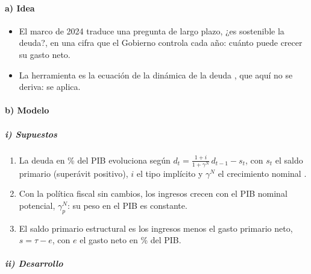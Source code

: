 \documentclass[11pt]{article}
\begin{document}
\paragraph{a) Idea}

\begin{itemize}
\item El marco de 2024 traduce una pregunta de largo plazo, ¿es sostenible la deuda?, en una cifra que el Gobierno controla cada año: cuánto puede crecer su gasto neto.
\item La herramienta es la ecuación de la dinámica de la deuda , que aquí no se deriva: se aplica.
\end{itemize}

\paragraph{b) Modelo}

\subparagraph{i) Supuestos}

\begin{enumerate}
\item La deuda en \% del PIB evoluciona según $d_t=\frac{1+i}{1+\gamma^N}\,d_{t-1}-s_t$, con $s_t$ el saldo primario (superávit positivo), $i$ el tipo implícito y $\gamma^N$ el crecimiento nominal .
\item Con la política fiscal sin cambios, los ingresos crecen con el PIB nominal potencial, $\gamma^N_{p}$: su peso en el PIB es constante.
\item El saldo primario estructural es los ingresos menos el gasto primario neto, $s=\tau-e$, con $e$ el gasto neto en \% del PIB.
\end{enumerate}

\subparagraph{ii) Desarrollo}
\end{document}
